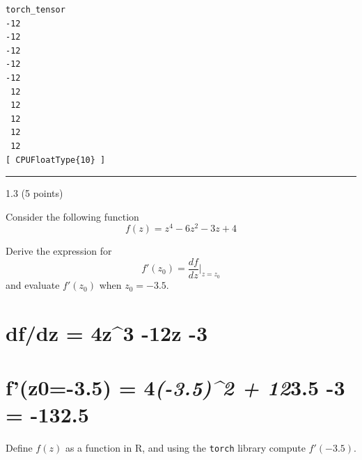 \documentclass[
  letterpaper,
  DIV=11,
  numbers=noendperiod]{scrartcl}
\newenvironment{Shaded}{\begin{snugshade}}{\end{snugshade}}
\newcommand{\ControlFlowTok}[1]{\textcolor[rgb]{0.00,0.23,0.31}{#1}}
\newcommand{\DecValTok}[1]{\textcolor[rgb]{0.68,0.00,0.00}{#1}}
\newcommand{\FunctionTok}[1]{\textcolor[rgb]{0.28,0.35,0.67}{#1}}
\newcommand{\NormalTok}[1]{\textcolor[rgb]{0.00,0.23,0.31}{#1}}
\newcommand{\OtherTok}[1]{\textcolor[rgb]{0.00,0.23,0.31}{#1}}
\newcommand{\SpecialCharTok}[1]{\textcolor[rgb]{0.37,0.37,0.37}{#1}}
\begin{document}
\begin{Shaded}
\end{Shaded}

\begin{verbatim}
torch_tensor
-12
-12
-12
-12
-12
 12
 12
 12
 12
 12
[ CPUFloatType{10} ]
\end{verbatim}

\begin{center}\rule{0.5\linewidth}{0.5pt}\end{center}

1.3 (5 points)

Consider the following function \[
f(z) = z^4 - 6z^2 - 3z + 4
\]

Derive the expression for \[
f'(z_0) = \frac{df}{dz}\Bigg|_{z=z_0}
\] and evaluate \(f'(z_0)\) when \(z_0 = -3.5\).

\hypertarget{dfdz-4z3--12z--3}{%
\section{df/dz = 4z\^{}3 -12z -3}\label{dfdz-4z3--12z--3}}

\hypertarget{fz0-3.5-4-3.52-123.5--3--132.5}{%
\section{\texorpdfstring{f'(z0=-3.5) = 4\emph{(-3.5)\^{}2 + 12}3.5 -3 =
-132.5}{f'(z0=-3.5) = 4(-3.5)\^{}2 + 123.5 -3 = -132.5}}\label{fz0-3.5-4-3.52-123.5--3--132.5}}

Define \(f(z)\) as a function in R, and using the \texttt{torch} library
compute \(f'(-3.5)\).
\end{document}
